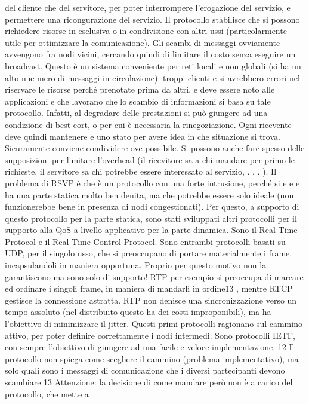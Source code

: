 del cliente che del servitore, per poter interrompere l'erogazione del servizio,
e permettere una ricongurazione del servizio. Il protocollo stabilisce che si
possono richiedere risorse in esclusiva o in condivisione con altri ussi (particolarmente utile per ottimizzare la
comunicazione). Gli scambi di messaggi
ovviamente avvengono fra nodi vicini, cercando quindi di limitare il costo senza
eseguire un broadcast.
Questo è un sistema conveniente per reti locali e non globali (si ha un alto nue
mero di messaggi in circolazione): troppi clienti e si avrebbero errori nel riservare
le risorse perché prenotate prima da altri, e deve essere noto alle applicazioni
e
che lavorano che lo scambio di informazioni si basa su tale protocollo. Infatti,
al degradare delle prestazioni si può giungere ad una condizione di best-eort,
o
per cui è necessaria la rinegoziazione. Ogni ricevente deve quindi mantenere
e
uno stato per avere idea in che situazione si trova. Sicuramente conviene condividere ove possibile. Si possono anche
fare spesso delle supposizioni per limitare
l'overhead (il ricevitore sa a chi mandare per primo le richieste, il servitore sa
chi potrebbe essere interessato al servizio, . . . ).
Il problema di RSVP è che è un protocollo con una forte intrusione, perché si
e
e
e
ha una parte statica molto ben denita, ma che potrebbe essere solo ideale (non
funzionerebbe bene in presenza di nodi congestionati). Per questo, a supporto
di questo protocollo per la parte statica, sono stati sviluppati altri protocolli
per il supporto alla QoS a livello applicativo per la parte dinamica. Sono il Real
Time Protocol e il Real Time Control Protocol. Sono entrambi protocolli basati
su UDP, per il singolo usso, che si preoccupano di portare materialmente i
frame, incapsulandoli in maniera opportuna. Proprio per questo motivo non
la garantiscono ma sono solo di supporto! RTP per esempio si preoccupa di
marcare ed ordinare i singoli frame, in maniera di mandarli in ordine13 , mentre
RTCP gestisce la connessione astratta.
RTP non denisce una sincronizzazione verso un tempo assoluto (nel distribuito questo ha dei costi improponibili), ma ha
l'obiettivo di minimizzare il
jitter. Questi primi protocolli ragionano sul cammino attivo, per poter definire
correttamente i nodi intermedi. Sono protocolli IETF, con sempre l'obiettivo di
giungere ad una facile e veloce implementazione.
12 Il protocollo non spiega come scegliere il cammino (problema implementativo), ma solo
quali sono i messaggi di comunicazione che i diversi partecipanti devono scambiare
13 Attenzione: la decisione di come mandare però non è a carico del protocollo, che mette a
